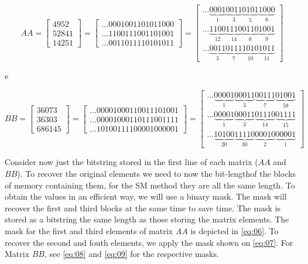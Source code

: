 \documentclass[12pt]{article}
\begin{document}
\begin{equation}\label{eq:01}
	AA = \begin{bmatrix}
			4952\\ 
			52841\\ 
			14251
		\end{bmatrix} 
        =
        \begin{bmatrix}
			\ldots0001001101011000\\ 
			\ldots1100111001101001\\ 
			\ldots0011011110101011
		\end{bmatrix}
        =
        \begin{bmatrix}
\ldots\underbrace{0001}_{1}\underbrace{0011}_{3}\underbrace{0101}_{5}\underbrace
{1000}_{8}\\
\ldots\underbrace{1100}_{12}\underbrace{1110}_{14}\underbrace{0110}_{6}
\underbrace{1001}_{9}\\ 
\ldots\underbrace{0011}_{3}\underbrace{0111}_{7}\underbrace{1010}_{10}
\underbrace{1011}_{11}
		\end{bmatrix}
\end{equation}

e

\begin{equation}\label{eq:02}
	BB = \begin{bmatrix}
			36073\\ 
			36303\\ 
			686145
		\end{bmatrix}
        =
         \begin{bmatrix}
			\ldots00001000110011101001\\ 
			\ldots00001000110111001111\\ 
			\ldots10100111100001000001
		\end{bmatrix}
        =
        \begin{bmatrix}

\ldots\underbrace{00001}_{1}\underbrace{00011}_{3}\underbrace{00111}_{7}
\underbrace{01001}_{59}\\
\ldots\underbrace{00001}_{1}\underbrace{00011}_{3}\underbrace{01110}_{14}
\underbrace{01111}_{15}\\
\ldots\underbrace{10100}_{20}\underbrace{11110}_{30}\underbrace{00010}_{2}
\underbrace{00001}_{1}
		\end{bmatrix}
\end{equation}

Consider now just the bitstring stored in the first line of each matrix ($AA$
and $BB$). To recover the original elements we need to now the bit-lengthof
the blocks of memory containing them, for the SM method they are all the same
length. To obtain the values in an efficient way, we will use a binary mask.
The mask will recover the first and third blocks at the same time to save time.
The mask is stored as a bitstring the same length as those storing the matrix
elements. The mask for the first and third elements of matrix $AA$ is depicted
in \ref{eq:06}. To recover the second and fouth elements, we apply the mask
shown on \ref{eq:07}. For Matrix $BB$, see \ref{eq:08} and \ref{eq:09} for the
respective masks.
\end{document}
